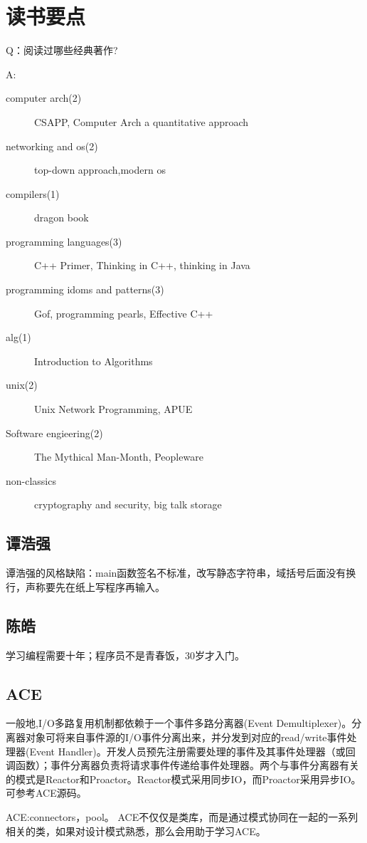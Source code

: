 \section{读书要点}
Q：阅读过哪些经典著作?

A:
\begin{description}
  \item[computer arch(2)] CSAPP, Computer Arch a quantitative approach
  \item[networking and os(2)]top-down approach,modern os
  \item[compilers(1)] dragon book
  \item[programming languages(3)] C++ Primer, Thinking in C++, thinking in Java
  \item[programming idoms and patterns(3)]Gof, programming pearls, Effective C++
  \item[alg(1)]Introduction to Algorithms
  \item[unix(2)]Unix Network Programming, APUE
  \item[Software engieering(2)]The Mythical Man-Month, Peopleware
  \item[non-classics]cryptography and security, big talk storage
\end{description}

\subsection{谭浩强}
谭浩强的风格缺陷：main函数签名不标准，改写静态字符串，域括号后面没有换行，声称要先在纸上写程序再输入。

\subsection{陈皓}
学习编程需要十年；程序员不是青春饭，30岁才入门。

\subsection{ACE}
一般地,I/O多路复用机制都依赖于一个事件多路分离器(Event Demultiplexer)。分离器对象可将来自事件源的I/O事件分离出来，并分发到对应的read/write事件处理器(Event Handler)。开发人员预先注册需要处理的事件及其事件处理器（或回调函数）；事件分离器负责将请求事件传递给事件处理器。两个与事件分离器有关的模式是Reactor和Proactor。Reactor模式采用同步IO，而Proactor采用异步IO。可参考ACE源码。

ACE:connectors，pool。
ACE不仅仅是类库，而是通过模式协同在一起的一系列相关的类，如果对设计模式熟悉，那么会用助于学习ACE。





